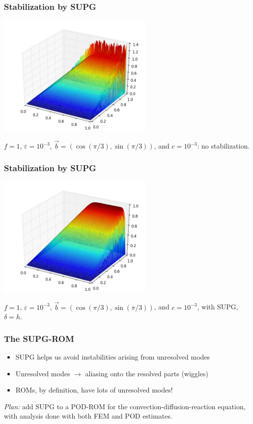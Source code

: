 \documentclass[8pt]{beamer}
\begin{document}
    \begin{frame}
        \frametitle{Stabilization by SUPG}
        \begin{center}
            \includegraphics[width=3in]{Pictures/CDR/cdr_unstabilized.png}

            \(f = 1\), \(\varepsilon = 10^{-3}\), \(\vec{b} = (\cos(\pi/3),
            \sin(\pi/3))\), and \(c = 10^{-3}\): no stabilization.
        \end{center}
    \end{frame}

    \begin{frame}
        \frametitle{Stabilization by SUPG}
        \begin{center}
            \includegraphics[width=3in]{Pictures/CDR/cdr_stabilized.png}

            \(f = 1\), \(\varepsilon = 10^{-3}\), \(\vec{b} = (\cos(\pi/3),
            \sin(\pi/3))\), and \(c = 10^{-3}\), with SUPG, \(\delta = h\).
        \end{center}
    \end{frame}

    \begin{frame}
        \frametitle{The SUPG-ROM}
        \begin{itemize}
            \item SUPG helps us avoid instabilities arising from unresolved
                  modes
                  \pause
            \item Unresolved modes \(\rightarrow\) aliasing onto the resolved
                  parts (wiggles)
                  \pause
            \item ROMs, by definition, have lots of unresolved modes!
        \end{itemize}
        \pause
        \emph{Plan:} add SUPG to a POD-ROM for the convection-diffusion-reaction
        equation, with analysis done with both FEM and POD estimates.
    \end{frame}
\end{document}
